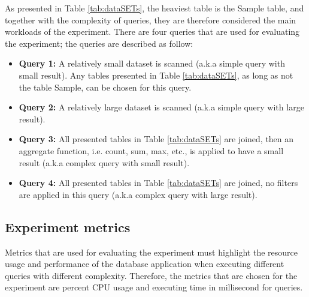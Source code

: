 As presented in Table \ref{tab:dataSETs}, the heaviest table is the Sample table, and together with the complexity of queries, they are therefore considered the main workloads of the experiment. There are four queries that are used for evaluating the experiment; the queries are described as follow:
\begin{itemize}
\item \textbf{Query 1:} A relatively small dataset is scanned (a.k.a simple query with small result). Any tables presented in Table \ref{tab:dataSETs}, as long as not the table Sample, can be chosen for this query.
\item \textbf{Query 2:} A relatively large dataset is scanned (a.k.a simple query with large result). 
\item \textbf{Query 3:} All presented tables in Table \ref{tab:dataSETs} are joined, then an aggregate function, i.e. count, sum, max, etc., is applied to have a small result (a.k.a complex query with small result).
\item \textbf{Query 4:} All presented tables in Table \ref{tab:dataSETs} are joined, no filters are applied in this query (a.k.a complex query with large result).
\end{itemize}
\subsection{Experiment metrics}
Metrics that are used for evaluating the experiment must highlight the resource usage and performance of the database application when executing different queries with different complexity. Therefore, the metrics that are chosen for the experiment are percent CPU usage and executing time in millisecond for queries. 
